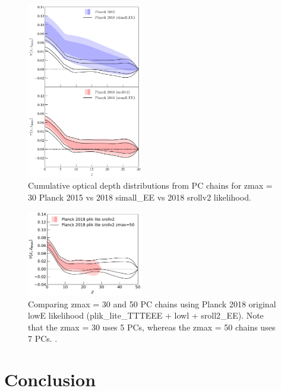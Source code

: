 \documentclass[prd,twocolumn,amsmath,amssymb,floatfix,superscriptaddress,nofootinbib]{revtex4-1}
\begin{document}
{{\begin{figure}[ht]
\includegraphics[width=0.45\textwidth]{paper/plots/pl18_taugtz_pc_zmax30_pl15_vs_pl18_simallEE_vs_pl18_srollv2.pdf}
\caption{Cumulative optical depth distributions from PC chains for zmax = 30 Planck 2015 vs 2018 simall\_EE vs 2018 srollv2 likelihood. 
}
\label{fig:plot_taugtz_2015_vs_2018_simallEE_vs_2018_srollv2}
\end{figure}


\begin{figure}[ht]
\includegraphics[width=0.45\textwidth]{results/direct_mcmc/pl18_plots_zmax30/plot_pub_tau_gtz_dz_0p1_pl18_pc_zmax30_pliklite_srollv2_0930_and_pl18_pc_zmax50_pliklite_srollv2.pdf}
\caption{Comparing zmax = 30 and 50 PC chains using Planck 2018 original lowE likelihood (plik\_lite\_TTTEEE + lowl + sroll2\_EE). Note that the zmax = 30 uses 5 PCs, whereas the zmax = 50 chains uses 7 PCs. .
}
\label{fig:plot_taugtz_zmax30_vs_zmax50}
\end{figure}


\section{Conclusion}
\label{sec:conclusion}




}}
\end{document}
